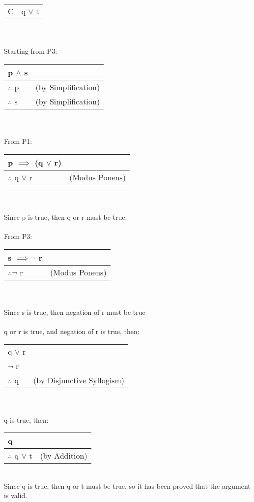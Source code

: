 \documentclass[addpoints]{exam}
\begin{document}
\begin{questions}
\begin{parts}
\begin{solution}
\begin{tabular}{ll}
        C & q $\lor$ t
      \end{tabular}
      \\\\ Starting from P3: \\
        \begin{tabular}{ll}
          p $ \land $ s \\\hline
          $\therefore$ p & (by Simplification) \\
          $\therefore$ s & (by Simplification)
        \end{tabular}
        \\\\From P1: \\
        \begin{tabular}{ll}
          p $\implies$ (q $\lor$ r) \\\hline
          $\therefore$ q $\lor$ r & (Modus Ponens) 
        \end{tabular}
        \\\\Since p is true, then q or r must be true.
        \\\\From P3: \\
        \begin{tabular}{ll}
          s $ \implies \neg $ r \\\hline
          $\therefore \neg$ r & (Modus Ponens)
        \end{tabular}
        \\\\Since s is true, then negation of r must be true
        \\\\q or r is true, and negation of r is true, then: \\
        \begin{tabular}{ll}
          q $\lor$ r \\
          $\neg$ r \\\hline
          $\therefore$ q & (by Disjunctive Syllogism)\\
        \end{tabular}
        \\\\q is true, then: \\
        \begin{tabular}{ll}
          q \\\hline
          $\therefore$ q $\lor$ t & (by Addition)
        \end{tabular}
        \\Since q is true, then q or t must be true, so it has been proved that the argument is valid. 
    \end{solution}
    

\end{parts}
\end{questions}
\end{document}
